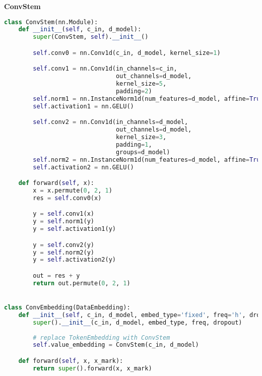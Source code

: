 {\noindent\hspace{-12.5pt}\normalsize\bfseries ConvStem}\vspace{-10pt}
\begin{center}
  \begin{lstlisting}[language=Python, 
  caption={Реализация блока ConvStem, состоящего из двух последовательных сверточных слоев с нормализацией и функцией активации.},  
  label={lst:convstem}]
class ConvStem(nn.Module):
    def __init__(self, c_in, d_model):
        super(ConvStem, self).__init__()

        self.conv0 = nn.Conv1d(c_in, d_model, kernel_size=1)

        self.conv1 = nn.Conv1d(in_channels=c_in,
                               out_channels=d_model,
                               kernel_size=5,
                               padding=2)
        self.norm1 = nn.InstanceNorm1d(num_features=d_model, affine=True)
        self.activation1 = nn.GELU()

        self.conv2 = nn.Conv1d(in_channels=d_model,
                               out_channels=d_model,
                               kernel_size=3,
                               padding=1,
                               groups=d_model)
        self.norm2 = nn.InstanceNorm1d(num_features=d_model, affine=True)
        self.activation2 = nn.GELU()

    def forward(self, x):
        x = x.permute(0, 2, 1) 
        res = self.conv0(x)

        y = self.conv1(x)
        y = self.norm1(y)
        y = self.activation1(y)

        y = self.conv2(y)
        y = self.norm2(y)
        y = self.activation2(y)

        out = res + y
        return out.permute(0, 2, 1)


class ConvEmbedding(DataEmbedding):
    def __init__(self, c_in, d_model, embed_type='fixed', freq='h', dropout=0.1):
        super().__init__(c_in, d_model, embed_type, freq, dropout)
        
        # replace TokenEmbedding with ConvStem
        self.value_embedding = ConvStem(c_in, d_model)

    def forward(self, x, x_mark):
        return super().forward(x, x_mark)
  \end{lstlisting}
\end{center}


